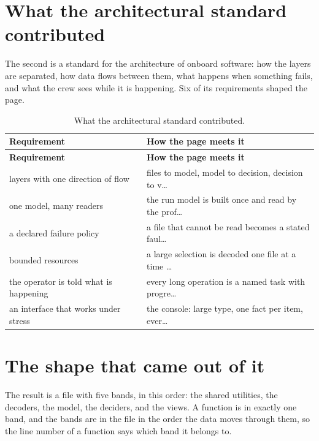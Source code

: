 \section{What the architectural standard contributed}
The second is a standard for the architecture of onboard software: how the layers
are separated, how data flows between them, what happens when something fails, and
what the crew sees while it is happening. Six of its requirements shaped the page.

{\small
\begin{xltabular}{\linewidth}{|X|l|}
\caption{What the architectural standard contributed.}\label{tab:struct-arch} \\
\toprule \textbf{Requirement} & \textbf{How the page meets it} \\\midrule\endfirsthead
\toprule \textbf{Requirement} & \textbf{How the page meets it} \\\midrule\endhead
layers with one direction of flow & files to model, model to decision, decision to v… \\
one model, many readers & the run model is built once and read by the prof… \\
a declared failure policy & a file that cannot be read becomes a stated faul… \\
bounded resources & a large selection is decoded one file at a time … \\
the operator is told what is happening & every long operation is a named task with progre… \\
an interface that works under stress & the console: large type, one fact per item, ever… \\
\bottomrule
\end{xltabular}}


\section{The shape that came out of it}
The result is a file with five bands, in this order: the shared utilities, the
decoders, the model, the deciders, and the views. A function is in exactly one
band, and the bands are in the file in the order the data moves through them, so
the line number of a function says which band it belongs to.

